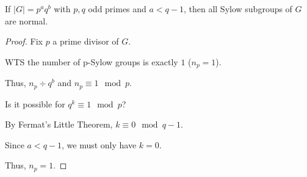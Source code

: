 \begin{remark}
    \begin{claim}
        If $|G| = p^a q^b$ with $p, q$ odd primes and $a < q - 1$, then all Sylow subgroups of $G$ are normal.
    \end{claim}

    \begin{proof}
        Fix $p$ a prime divisor of $G$. 

        WTS the number of p-Sylow groups is exactly $1$ ($n_p = 1$).

        Thus, $n_p \div q^b$ and $n_p \equiv 1 \mod p$.

        Is it possible for $q^k \equiv 1 \mod p$?

        By Fermat's Little Theorem, $k \equiv 0 \mod q - 1$.

        Since $a < q - 1$, we must only have $k = 0$.

        Thus, $n_p = 1$. 
    \end{proof}
\end{remark}